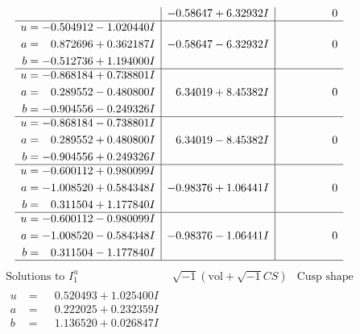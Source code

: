 \documentclass[1p]{elsarticle_modified}
\theoremstyle{definition}
\newcommand{\I}{\sqrt{-1}}
\begin{document}
$$\begin{array}{c|c|c}
 & -0.58647 + 6.32932 I & \phantom{-0.000000 } 0 \\ \hline\begin{aligned}
u &= -0.504912 - 1.020440 I \\
a &= \phantom{-}0.872696 + 0.362187 I \\
b &= -0.512736 + 1.194000 I\end{aligned}
 & -0.58647 - 6.32932 I & \phantom{-0.000000 } 0 \\ \hline\begin{aligned}
u &= -0.868184 + 0.738801 I \\
a &= \phantom{-}0.289552 - 0.480800 I \\
b &= -0.904556 - 0.249326 I\end{aligned}
 & \phantom{-}6.34019 + 8.45382 I & \phantom{-0.000000 } 0 \\ \hline\begin{aligned}
u &= -0.868184 - 0.738801 I \\
a &= \phantom{-}0.289552 + 0.480800 I \\
b &= -0.904556 + 0.249326 I\end{aligned}
 & \phantom{-}6.34019 - 8.45382 I & \phantom{-0.000000 } 0 \\ \hline\begin{aligned}
u &= -0.600112 + 0.980099 I \\
a &= -1.008520 + 0.584348 I \\
b &= \phantom{-}0.311504 + 1.177840 I\end{aligned}
 & -0.98376 + 1.06441 I & \phantom{-0.000000 } 0 \\ \hline\begin{aligned}
u &= -0.600112 - 0.980099 I \\
a &= -1.008520 - 0.584348 I \\
b &= \phantom{-}0.311504 - 1.177840 I\end{aligned}
 & -0.98376 - 1.06441 I & \phantom{-0.000000 } 0\\
 \hline 
 \end{array}$$\newpage$$\begin{array}{c|c|c}  
\text{Solutions to }I^u_{1}& \I (\text{vol} + \sqrt{-1}CS) & \text{Cusp shape}\\
 \hline 
\begin{aligned}
u &= \phantom{-}0.520493 + 1.025400 I \\
a &= \phantom{-}0.222025 + 0.232359 I \\
b &= \phantom{-}1.136520 + 0.026847 I\end{aligned}

\end{array}$$
\end{document}
